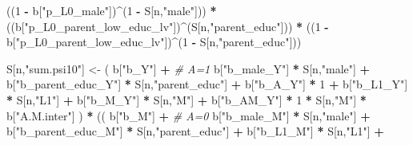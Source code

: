 \documentclass[
]{book}
\newenvironment{Shaded}{\begin{snugshade}}{\end{snugshade}}
\newcommand{\CommentTok}[1]{\textcolor[rgb]{0.56,0.35,0.01}{\textit{#1}}}
\newcommand{\DecValTok}[1]{\textcolor[rgb]{0.00,0.00,0.81}{#1}}
\newcommand{\NormalTok}[1]{#1}
\newcommand{\OtherTok}[1]{\textcolor[rgb]{0.56,0.35,0.01}{#1}}
\newcommand{\SpecialCharTok}[1]{\textcolor[rgb]{0.81,0.36,0.00}{\textbf{#1}}}
\newcommand{\StringTok}[1]{\textcolor[rgb]{0.31,0.60,0.02}{#1}}
\begin{document}
\begin{Shaded}
\begin{Highlighting}[]
\NormalTok{      ((}\DecValTok{1} \SpecialCharTok{{-}}\NormalTok{ b[}\StringTok{"p\_L0\_male"}\NormalTok{])}\SpecialCharTok{\^{}}\NormalTok{(}\DecValTok{1} \SpecialCharTok{{-}}\NormalTok{ S[n,}\StringTok{"male"}\NormalTok{])) }\SpecialCharTok{*} 
\NormalTok{      ((b[}\StringTok{"p\_L0\_parent\_low\_educ\_lv"}\NormalTok{])}\SpecialCharTok{\^{}}\NormalTok{(S[n,}\StringTok{"parent\_educ"}\NormalTok{])) }\SpecialCharTok{*}
\NormalTok{      ((}\DecValTok{1} \SpecialCharTok{{-}}\NormalTok{ b[}\StringTok{"p\_L0\_parent\_low\_educ\_lv"}\NormalTok{])}\SpecialCharTok{\^{}}\NormalTok{(}\DecValTok{1} \SpecialCharTok{{-}}\NormalTok{ S[n,}\StringTok{"parent\_educ"}\NormalTok{])) }
    
\NormalTok{    S[n,}\StringTok{"sum.psi10"}\NormalTok{] }\OtherTok{\textless{}{-}}\NormalTok{  ( b[}\StringTok{"b\_Y"}\NormalTok{] }\SpecialCharTok{+}                                           \CommentTok{\# A=1}
\NormalTok{                             b[}\StringTok{"b\_male\_Y"}\NormalTok{] }\SpecialCharTok{*}\NormalTok{ S[n,}\StringTok{"male"}\NormalTok{] }\SpecialCharTok{+} 
\NormalTok{                             b[}\StringTok{"b\_parent\_educ\_Y"}\NormalTok{] }\SpecialCharTok{*}\NormalTok{ S[n,}\StringTok{"parent\_educ"}\NormalTok{] }\SpecialCharTok{+} 
\NormalTok{                             b[}\StringTok{"b\_A\_Y"}\NormalTok{] }\SpecialCharTok{*} \DecValTok{1} \SpecialCharTok{+} 
\NormalTok{                             b[}\StringTok{"b\_L1\_Y"}\NormalTok{] }\SpecialCharTok{*}\NormalTok{ S[n,}\StringTok{"L1"}\NormalTok{] }\SpecialCharTok{+}
\NormalTok{                             b[}\StringTok{"b\_M\_Y"}\NormalTok{] }\SpecialCharTok{*}\NormalTok{ S[n,}\StringTok{"M"}\NormalTok{] }\SpecialCharTok{+}
\NormalTok{                             b[}\StringTok{"b\_AM\_Y"}\NormalTok{] }\SpecialCharTok{*} \DecValTok{1} \SpecialCharTok{*}\NormalTok{ S[n,}\StringTok{"M"}\NormalTok{] }\SpecialCharTok{*}\NormalTok{ b[}\StringTok{"A.M.inter"}\NormalTok{] ) }\SpecialCharTok{*}
\NormalTok{      (( b[}\StringTok{"b\_M"}\NormalTok{] }\SpecialCharTok{+}                                                             \CommentTok{\# A\textquotesingle{}=0}
\NormalTok{           b[}\StringTok{"b\_male\_M"}\NormalTok{] }\SpecialCharTok{*}\NormalTok{ S[n,}\StringTok{"male"}\NormalTok{] }\SpecialCharTok{+} 
\NormalTok{           b[}\StringTok{"b\_parent\_educ\_M"}\NormalTok{] }\SpecialCharTok{*}\NormalTok{ S[n,}\StringTok{"parent\_educ"}\NormalTok{] }\SpecialCharTok{+} 
\NormalTok{           b[}\StringTok{"b\_L1\_M"}\NormalTok{] }\SpecialCharTok{*}\NormalTok{ S[n,}\StringTok{"L1"}\NormalTok{] }\SpecialCharTok{+}

\end{Highlighting}
\end{Shaded}
\end{document}
